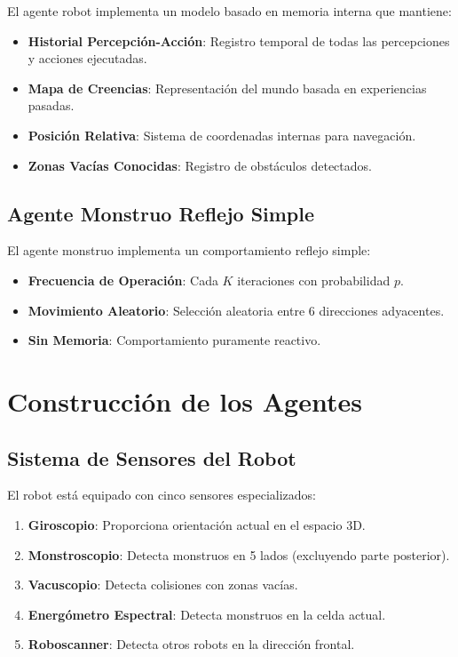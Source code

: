 \documentclass[10pt,twocolumn]{article}
\begin{document}
El agente robot implementa un modelo basado en memoria interna que mantiene:

\begin{itemize}
\item \textbf{Historial Percepción-Acción}: Registro temporal de todas las percepciones y acciones ejecutadas.
\item \textbf{Mapa de Creencias}: Representación del mundo basada en experiencias pasadas.
\item \textbf{Posición Relativa}: Sistema de coordenadas internas para navegación.
\item \textbf{Zonas Vacías Conocidas}: Registro de obstáculos detectados.
\end{itemize}

\subsection{Agente Monstruo Reflejo Simple}

El agente monstruo implementa un comportamiento reflejo simple:

\begin{itemize}
\item \textbf{Frecuencia de Operación}: Cada $K$ iteraciones con probabilidad $p$.
\item \textbf{Movimiento Aleatorio}: Selección aleatoria entre 6 direcciones adyacentes.
\item \textbf{Sin Memoria}: Comportamiento puramente reactivo.
\end{itemize}

\section{Construcción de los Agentes}

\subsection{Sistema de Sensores del Robot}

El robot está equipado con cinco sensores especializados:

\begin{enumerate}
\item \textbf{Giroscopio}: Proporciona orientación actual en el espacio 3D.
\item \textbf{Monstroscopio}: Detecta monstruos en 5 lados (excluyendo parte posterior).
\item \textbf{Vacuscopio}: Detecta colisiones con zonas vacías.
\item \textbf{Energómetro Espectral}: Detecta monstruos en la celda actual.
\item \textbf{Roboscanner}: Detecta otros robots en la dirección frontal.
\end{enumerate}
\end{document}
